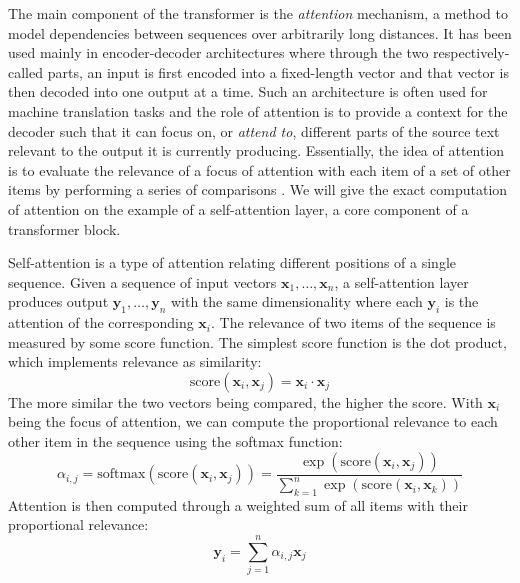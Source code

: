The main component of the transformer is the 
\textit{attention} mechanism, a method to model 
dependencies between sequences over arbitrarily long 
distances. It has been used mainly in 
encoder-decoder architectures where 
through the two respectively-called 
parts, an input is first encoded 
into a fixed-length vector and that vector is then decoded 
into one output at a time. Such an architecture is often used
for machine translation tasks \parencite{translation} and
the role of attention
is to provide a context 
for the decoder such that it can focus on, 
or \textit{attend to}, different parts 
of the source text relevant 
to the output it is currently producing. 
Essentially, 
the idea of attention is to evaluate the relevance of a
focus of attention with each item of a set of other items
by performing a series of comparisons
\parencite[Chapter 9]{jurafsky}.  
We will give the exact computation of attention on the 
example of a self-attention layer, a core component of 
a transformer block. 

Self-attention is a type of attention relating different 
positions of a single sequence. Given a sequence
of input vectors $\mathbf{x}_1, \dots, \mathbf{x}_n$,
a self-attention layer 
produces output $\mathbf{y}_1, \dots, \mathbf{y}_n$
with the same dimensionality where each 
$\mathbf{y}_i$ is the attention of the corresponding
$\mathbf{x}_i$. The relevance of two items of the 
sequence is measured by some score function. 
The simplest score function is the dot product, which 
implements relevance as similarity: 
\begin{equation}
    \textrm{score}(\mathbf{x}_i, \mathbf{x}_j) = \mathbf{x}_i \cdot \mathbf{x}_j
\end{equation}
The more similar the two vectors being compared, 
the higher the score. With $\mathbf{x}_i$ being the
focus of attention, we can compute the proportional 
relevance to each other item in the sequence using 
the softmax function:
\begin{equation}
    \alpha_{i, j} = \textrm{softmax}(\textrm{score}(\mathbf{x}_i, \mathbf{x}_j)) = \frac{\exp(\textrm{score}(\mathbf{x}_i, \mathbf{x}_j))}{\sum_{k=1}^n \exp(\textrm{score}(\mathbf{x}_i, \mathbf{x}_k))}
\end{equation} 
Attention is then computed through a weighted sum of 
all items with their proportional relevance:
\begin{equation}
    \mathbf{y}_i = \sum_{j=1}^n \alpha_{i, j} \mathbf{x}_j
\end{equation}

